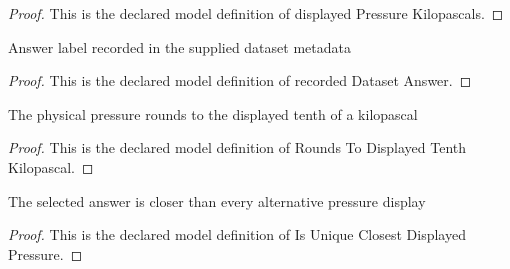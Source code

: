 \begin{proof}
  This is the declared model definition of displayed Pressure Kilopascals.
\end{proof}
\begin{definition}
  \label{def:physics:phyx-mini-0399:phyxminiproblems-problemphyxmini0399-recordeddatasetanswer}
  Answer label recorded in the supplied dataset metadata
\end{definition}
\begin{proof}
  This is the declared model definition of recorded Dataset Answer.
\end{proof}
\begin{definition}
  \label{def:physics:phyx-mini-0399:phyxminiproblems-problemphyxmini0399-roundstodisplayedtenthkilopascal}
  The physical pressure rounds to the displayed tenth of a kilopascal
\end{definition}
\begin{proof}
  This is the declared model definition of Rounds To Displayed Tenth Kilopascal.
\end{proof}
\begin{definition}
  \label{def:physics:phyx-mini-0399:phyxminiproblems-problemphyxmini0399-isuniqueclosestdisplayedpressure}
  The selected answer is closer than every alternative pressure display
\end{definition}
\begin{proof}
  This is the declared model definition of Is Unique Closest Displayed Pressure.
\end{proof}
